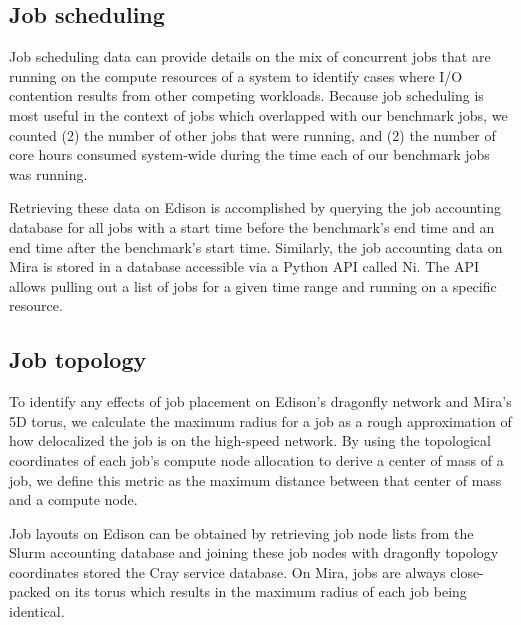\subsection{Job scheduling} \label{sec:methods/scheduling}

Job scheduling data can provide details on the mix of concurrent jobs that are running on the compute resources of a system to identify cases where I/O contention results from other competing workloads.
Because job scheduling is most useful in the context of jobs which overlapped with our benchmark jobs, we counted (2) the number of other jobs that were running, and (2) the number of core hours consumed system-wide during the time each of our benchmark jobs was running.

Retrieving these data on Edison is accomplished by querying the job accounting database for all jobs with a start time before the benchmark's end time and an end time after the benchmark's start time.
Similarly, the job accounting data on Mira is stored in a database accessible via a Python API called Ni.
The API allows pulling out a list of jobs for a given time range and running on a specific resource.

\subsection{Job topology} \label{sec:methods/other}

To identify any effects of job placement on Edison's dragonfly network and Mira's 5D torus, we calculate the maximum radius for a job as a rough approximation of how delocalized the job is on the high-speed network.
By using the topological coordinates of each job's compute node allocation to derive a center of mass of a job, we define this metric as the maximum distance between that center of mass and a compute node.

Job layouts on Edison can be obtained by retrieving job node lists from the Slurm accounting database and joining these job nodes with dragonfly topology coordinates stored the Cray service database.
On Mira, jobs are always close-packed on its torus which results in the maximum radius of each job being identical.